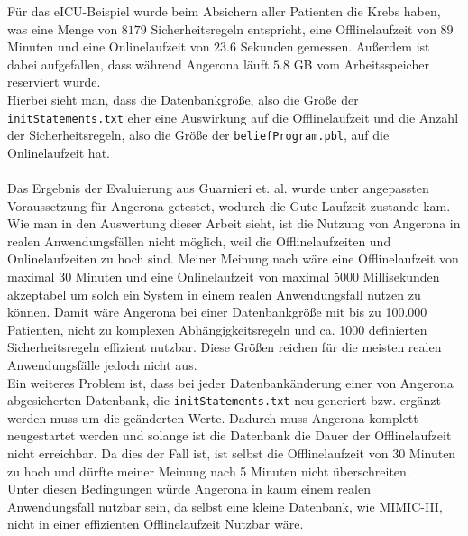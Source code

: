 \documentclass[german,version-2020-11]{uzl-thesis}
\begin{document}
Für das eICU-Beispiel wurde beim Absichern aller Patienten die Krebs haben, was eine Menge von $8179$ Sicherheitsregeln entspricht, eine Offlinelaufzeit von $89$ Minuten und eine Onlinelaufzeit von $23.6$ Sekunden gemessen. Außerdem ist dabei aufgefallen, dass während Angerona läuft $5.8$ GB vom Arbeitsspeicher reserviert wurde. \\ 
Hierbei sieht man, dass die Datenbankgröße, also die Größe der \texttt{initStatements.txt} eher eine Auswirkung auf die Offlinelaufzeit und die Anzahl der Sicherheitsregeln, also die Größe der \texttt{beliefProgram.pbl}, auf die Onlinelaufzeit hat. \\ \\ 
Das Ergebnis der Evaluierung aus Guarnieri et. al. \cite{guarnieri2017securing} wurde unter angepassten Voraussetzung für Angerona getestet, wodurch die Gute Laufzeit zustande kam. Wie man in den Auswertung dieser Arbeit sieht, ist die Nutzung von Angerona in realen Anwendungsfällen nicht möglich, weil die Offlinelaufzeiten und Onlinelaufzeiten zu hoch sind. Meiner Meinung nach wäre eine Offlinelaufzeit von maximal 30 Minuten und eine Onlinelaufzeit von maximal 5000 Millisekunden akzeptabel um solch ein System in einem realen Anwendungsfall nutzen zu können. Damit wäre Angerona bei einer Datenbankgröße mit bis zu 100.000 Patienten, nicht zu komplexen Abhängigkeitsregeln und ca. 1000 definierten Sicherheitsregeln effizient nutzbar. Diese Größen reichen für die meisten realen Anwendungsfälle jedoch nicht aus. \\ 
Ein weiteres Problem ist, dass bei jeder Datenbankänderung einer von Angerona abgesicherten Datenbank, die \texttt{initStatements.txt} neu generiert bzw. ergänzt werden muss um die geänderten Werte. Dadurch muss Angerona komplett neugestartet werden und solange ist die Datenbank die Dauer der Offlinelaufzeit nicht erreichbar. Da dies der Fall ist, ist selbst die Offlinelaufzeit von 30 Minuten zu hoch und dürfte meiner Meinung nach 5 Minuten nicht überschreiten. \\ Unter diesen Bedingungen würde Angerona in kaum einem realen Anwendungsfall nutzbar sein, da selbst eine kleine Datenbank, wie MIMIC-III, nicht in einer effizienten Offlinelaufzeit Nutzbar wäre.
\end{document}
